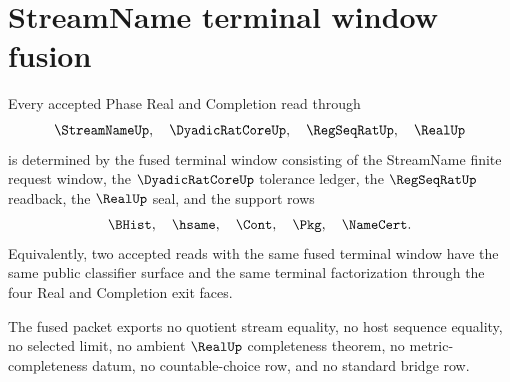 \section{StreamName terminal window fusion}
\label{sec:streamname-terminal-window-fusion}

\begin{theorem}
\label{thm:streamname-real-completion-terminal-window-fusion}
Every accepted Phase Real and Completion read through
$$
\StreamNameUp,\quad \DyadicRatCoreUp,\quad \RegSeqRatUp,\quad \RealUp
$$
is determined by the fused terminal window consisting of the StreamName finite request window, the $\DyadicRatCoreUp$ tolerance ledger, the $\RegSeqRatUp$ readback, the $\RealUp$ seal, and the support rows
$$
\BHist,\quad \hsame,\quad \Cont,\quad \Pkg,\quad \NameCert.
$$
Equivalently, two accepted reads with the same fused terminal window have the same public classifier surface and the same terminal factorization through the four Real and Completion exit faces.

The fused packet exports no quotient stream equality, no host sequence equality, no selected limit, no ambient $\RealUp$ completeness theorem, no metric-completeness datum, no countable-choice row, and no standard bridge row.
\end{theorem}

